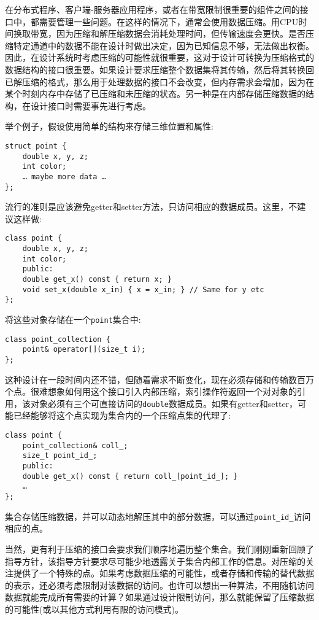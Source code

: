 在分布式程序、客户端-服务器应用程序，或者在带宽限制很重要的组件之间的接口中，都需要管理一些问题。在这样的情况下，通常会使用数据压缩。用CPU时间换取带宽，因为压缩和解压缩数据会消耗处理时间，但传输速度会更快。是否压缩特定通道中的数据不能在设计时做出决定，因为已知信息不够，无法做出权衡。因此，在设计系统时考虑压缩的可能性就很重要，这对于设计可转换为压缩格式的数据结构的接口很重要。如果设计要求压缩整个数据集将其传输，然后将其转换回已解压缩的格式，那么用于处理数据的接口不会改变，但内存需求会增加，因为在某个时刻内存中存储了已压缩和未压缩的状态。另一种是在内部存储压缩数据的结构，在设计接口时需要事先进行考虑。 

举个例子，假设使用简单的结构来存储三维位置和属性:

\begin{lstlisting}[style=styleCXX]
struct point {
	double x, y, z;
	int color;
	… maybe more data …
};
\end{lstlisting}

流行的准则是应该避免getter和setter方法，只访问相应的数据成员。这里，不建议这样做:

\begin{lstlisting}[style=styleCXX]
class point {
	double x, y, z;
	int color;
	public:
	double get_x() const { return x; }
	void set_x(double x_in) { x = x_in; } // Same for y etc
};
\end{lstlisting}

将这些对象存储在一个\texttt{point}集合中:

\begin{lstlisting}[style=styleCXX]
class point_collection {
	point& operator[](size_t i);
};
\end{lstlisting}

这种设计在一段时间内还不错，但随着需求不断变化，现在必须存储和传输数百万个点。很难想象如何用这个接口引入内部压缩，索引操作符返回一个对对象的引用，该对象必须有三个可直接访问的\texttt{double}数据成员。如果有getter和setter，可能已经能够将这个点实现为集合内的一个压缩点集的代理了:

\begin{lstlisting}[style=styleCXX]
class point {
	point_collection& coll_;
	size_t point_id_;
	public:
	double get_x() const { return coll_[point_id_]; }
	…
};
\end{lstlisting}

集合存储压缩数据，并可以动态地解压其中的部分数据，可以通过\texttt{point\_id\_}访问相应的点。

当然，更有利于压缩的接口会要求我们顺序地遍历整个集合。我们刚刚重新回顾了指导方针，该指导方针要求尽可能少地透露关于集合内部工作的信息。对压缩的关注提供了一个特殊的点。如果考虑数据压缩的可能性，或者存储和传输的替代数据的表示，还必须考虑限制对该数据的访问。也许可以想出一种算法，不用随机访问数据就能完成所有需要的计算？如果通过设计限制访问，那么就能保留了压缩数据的可能性(或以其他方式利用有限的访问模式)。

